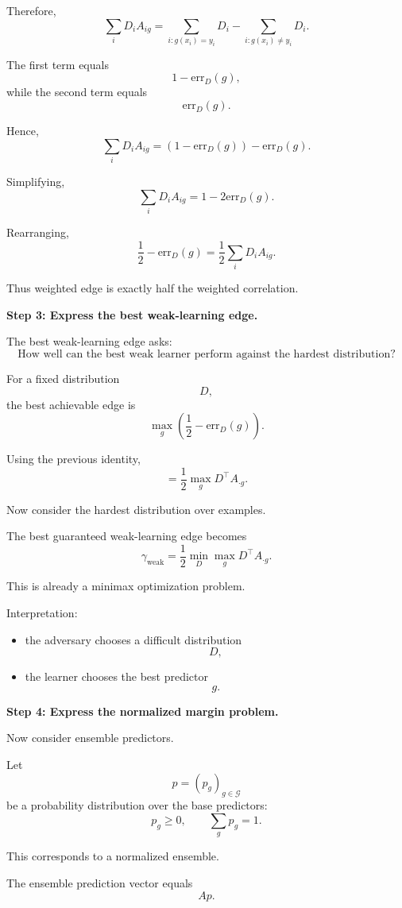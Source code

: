 \documentclass[11pt]{article}
\begin{document}
\begin{enumerate}
\begin{solutionbox}
Therefore,
\[
\sum_iD_iA_{ig}
=
\sum_{i:g(x_i)=y_i}D_i
-
\sum_{i:g(x_i)\neq y_i}D_i.
\]

The first term equals
\[
1-\mathrm{err}_D(g),
\]
while the second term equals
\[
\mathrm{err}_D(g).
\]

Hence,
\[
\sum_iD_iA_{ig}
=
(1-\mathrm{err}_D(g))
-
\mathrm{err}_D(g).
\]

Simplifying,
\[
\boxed{
\sum_iD_iA_{ig}
=
1-2\mathrm{err}_D(g).
}
\]

Rearranging,
\[
\boxed{
\frac12-\mathrm{err}_D(g)
=
\frac12
\sum_iD_iA_{ig}.
}
\]

Thus weighted edge is exactly half the weighted correlation.

\medskip

\textbf{Step 3: Express the best weak-learning edge.}

The best weak-learning edge asks:
\[
\text{How well can the best weak learner perform against the hardest distribution?}
\]

For a fixed distribution
\[
D,
\]
the best achievable edge is
\[
\max_g
\left(
\frac12-\mathrm{err}_D(g)
\right).
\]

Using the previous identity,
\[
=
\frac12
\max_g
D^\top A_{\cdot g}.
\]

Now consider the hardest distribution over examples.

The best guaranteed weak-learning edge becomes
\[
\boxed{
\gamma_{\mathrm{weak}}
=
\frac12
\min_D
\max_g
D^\top A_{\cdot g}.
}
\]

This is already a minimax optimization problem.

Interpretation:
\begin{itemize}
    \item the adversary chooses a difficult distribution
    \[
    D,
    \]
    \item the learner chooses the best predictor
    \[
    g.
    \]
\end{itemize}

\medskip

\textbf{Step 4: Express the normalized margin problem.}

Now consider ensemble predictors.

Let
\[
p=(p_g)_{g\in\mathcal G}
\]
be a probability distribution over the base predictors:
\[
p_g\ge0,
\qquad
\sum_gp_g=1.
\]

This corresponds to a normalized ensemble.

The ensemble prediction vector equals
\[
Ap.
\]


\end{solutionbox}
\end{enumerate}
\end{document}
